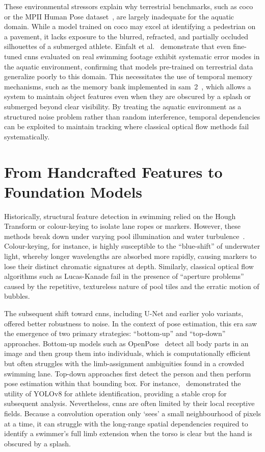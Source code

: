 These environmental stressors explain why terrestrial benchmarks, such as
\gls{coco}~\cite{lin2014microsoft} or the MPII Human Pose dataset~\cite{andriluka20142d}, are largely
inadequate for the aquatic domain. While a model trained on \gls{coco} may excel at identifying a
pedestrian on a pavement, it lacks exposure to the blurred, refracted, and partially occluded
silhouettes of a submerged athlete. Einfalt et al.~\cite{einfalt2018activity} demonstrate that
even fine-tuned \gls{cnn}s evaluated on real swimming footage exhibit systematic error modes in the
aquatic environment, confirming that models pre-trained on terrestrial data generalize poorly to
this domain. This necessitates the use of temporal memory mechanisms, such as the memory bank
implemented in \gls{sam}~2~\cite{ravi2024sam}, which allows a system to maintain object features even
when they are obscured by a splash or submerged beyond clear visibility. By treating the aquatic
environment as a structured noise problem rather than random interference, temporal dependencies
can be exploited to maintain tracking where classical optical flow methods fail systematically.

\section{From Handcrafted Features to Foundation Models}
Historically, structural feature detection in swimming relied on the Hough Transform or
colour-keying to isolate lane ropes or markers. However, these methods break down under varying
pool illumination and water turbulence~\cite{holzmann_measuring_2012}. Colour-keying, for
instance, is highly susceptible to the ``blue-shift'' of underwater light, whereby longer
wavelengths are absorbed more rapidly, causing markers to lose their distinct chromatic
signatures at depth. Similarly, classical optical flow algorithms such as Lucas-Kanade fail in
the presence of ``aperture problems'' caused by the repetitive, textureless nature of pool tiles
and the erratic motion of bubbles.

The subsequent shift toward \gls{cnn}s, including U-Net and earlier \gls{yolo} variants, offered better robustness to noise. In the context of pose estimation, this era
saw the emergence of two primary strategies: ``bottom-up'' and ``top-down'' approaches.
Bottom-up models such as OpenPose~\cite{cao2019openpose} detect all body parts in an image and
then group them into individuals, which is computationally efficient but often struggles with the
limb-assignment ambiguities found in a crowded swimming lane. Top-down approaches first detect
the person and then perform pose estimation within that bounding box. For
instance,~\cite{al-majnoni_moar_2025} demonstrated the utility of YOLOv8 for athlete
identification, providing a stable crop for subsequent analysis. Nevertheless, \gls{cnn}s are often
limited by their local receptive fields. Because a convolution operation only `sees' a small
neighbourhood of pixels at a time, it can struggle with the long-range spatial dependencies
required to identify a swimmer's full limb extension when the torso is clear but the hand is
obscured by a splash.

